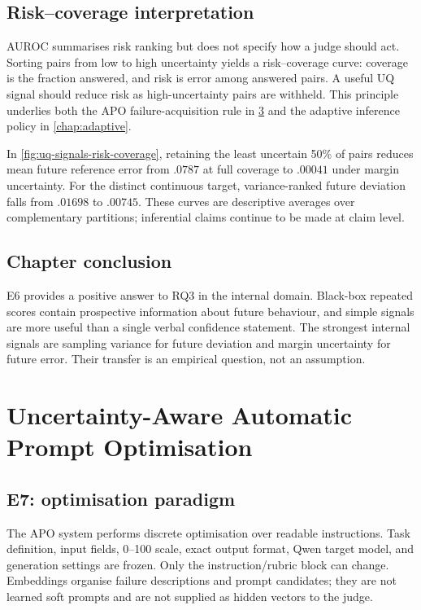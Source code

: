 \documentclass[11pt,twoside,a4paper]{report}
\begin{document}
\section{Risk--coverage interpretation}

AUROC summarises risk ranking but does not specify how a judge should act.  Sorting
pairs from low to high uncertainty yields a risk--coverage curve: coverage is the
fraction answered, and risk is error among answered pairs.  A useful UQ signal should
reduce risk as high-uncertainty pairs are withheld.  This principle underlies both
the APO failure-acquisition rule in \cref{chap:apo} and the adaptive inference policy
in \cref{chap:adaptive}.

In \cref{fig:uq-signals-risk-coverage}, retaining the least uncertain 50\% of pairs
reduces mean future reference error from $.0787$ at full coverage to $.00041$ under
margin uncertainty.  For the distinct continuous target, variance-ranked future
deviation falls from $.01698$ to $.00745$.  These curves are descriptive averages
over complementary partitions; inferential claims continue to be made at claim level.

\section{Chapter conclusion}

E6 provides a positive answer to RQ3 in the internal domain.  Black-box repeated
scores contain prospective information about future behaviour, and simple signals
are more useful than a single verbal confidence statement.  The strongest internal
signals are sampling variance for future deviation and margin uncertainty for future
error.  Their transfer is an empirical question, not an assumption.

\chapter{Uncertainty-Aware Automatic Prompt Optimisation}
\label{chap:apo}

\section{E7: optimisation paradigm}

The APO system performs discrete optimisation over readable instructions.  Task
definition, input fields, 0--100 scale, exact output format, Qwen target model, and
generation settings are frozen.  Only the instruction/rubric block can change.
Embeddings organise failure descriptions and prompt candidates; they are not learned
soft prompts and are not supplied as hidden vectors to the judge.
\end{document}

